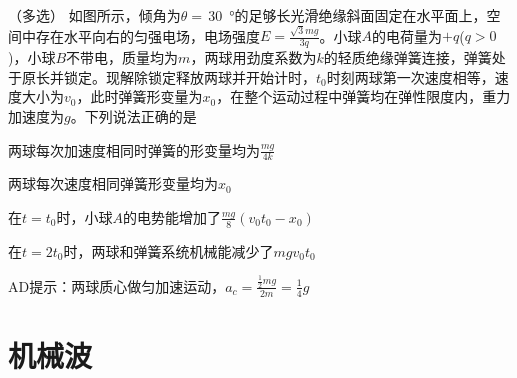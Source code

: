 \begin{proset}
    （多选）
    如图所示，倾角为\(\theta =\)\,\qty{30}{\degree}的足够长光滑绝缘斜面固定在水平面上，空间中存在水平向右的匀强电场，电场强度\(E = \frac{\sqrt{3}mg}{3q} \)。小球\(A\)的电荷量为\( + q\)(\(q > 0\))，小球\(B\)不带电，质量均为\(m\)，两球用劲度系数为\(k\)的轻质绝缘弹簧连接，弹簧处于原长并锁定。现解除锁定释放两球并开始计时，\(t_0\)时刻两球第一次速度相等，速度大小为\(v_0\)，此时弹簧形变量为\(x_0\)，在整个运动过程中弹簧均在弹性限度内，重力加速度为\(g\)。下列说法正确的是\paren[]

    \begin{choices}
        \item 两球每次加速度相同时弹簧的形变量均为\(\frac{mg}{4k}\)
        \item 两球每次速度相同弹簧形变量均为\(x_0\)
        \item 在\(t = t_0\)时，小球\(A\)的电势能增加了\(\frac{mg}{8}(v_0t_0 - x_0)\)
        \item 在\(t = 2t_0\)时，两球和弹簧系统机械能减少了\(mgv_0t_0\)
    \end{choices}
\end{proset}
\begin{answer}
    AD\quad 提示：两球质心做匀加速运动，\(a_c = \frac{\frac{1}{2}mg}{2m} = \frac{1}{4}g\)
\end{answer}

\section{机械波}

